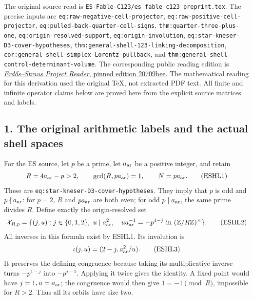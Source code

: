\documentclass[
  10pt,
  a4paper,
]{article}
\begin{document}
The original source read is
\texttt{ES-\allowbreak{}Fable-\allowbreak{}C123/\allowbreak{}es\_\allowbreak{}fable\_\allowbreak{}c123\_\allowbreak{}preprint.\allowbreak{}tex}. The precise inputs
are \texttt{eq:\allowbreak{}raw-\allowbreak{}negative-\allowbreak{}cell-\allowbreak{}projector},
\texttt{eq:\allowbreak{}raw-\allowbreak{}positive-\allowbreak{}cell-\allowbreak{}projector},
\texttt{eq:\allowbreak{}pulled-\allowbreak{}back-\allowbreak{}quarter-\allowbreak{}cell-\allowbreak{}signs},
\texttt{thm:\allowbreak{}quarter-\allowbreak{}three-\allowbreak{}plus-\allowbreak{}one},
\texttt{eq:\allowbreak{}origin-\allowbreak{}resolved-\allowbreak{}support}, \texttt{eq:\allowbreak{}origin-\allowbreak{}involution},
\texttt{eq:\allowbreak{}star-\allowbreak{}kneser-\allowbreak{}D3-\allowbreak{}cover-\allowbreak{}hypotheses},
\texttt{thm:\allowbreak{}general-\allowbreak{}shell-\allowbreak{}123-\allowbreak{}linking-\allowbreak{}decomposition},
\texttt{cor:\allowbreak{}general-\allowbreak{}shell-\allowbreak{}simplex-\allowbreak{}Lorentz-\allowbreak{}pullback}, and
\texttt{thm:\allowbreak{}general-\allowbreak{}shell-\allowbreak{}control-\allowbreak{}determinant-\allowbreak{}volume}. The corresponding
public reading edition is
\href{https://github.com/KokunoYumeto/erdos-straus-foundation/blob/20709bee872ad10e4cc7d7b976d975e24532a803/00_ERDOS_STRAUSS_Project_Reader.pdf}{\emph{Erdős--Straus
Project Reader}, pinned edition 20709bee}. The mathematical reading for
this derivation used the original TeX, not extracted PDF text. All
finite and infinite operator claims below are proved here from the
explicit source matrices and labels.

\subsection{1. The original arithmetic labels and the actual shell
spaces}\label{the-original-arithmetic-labels-and-the-actual-shell-spaces}

For the ES source, let \(p\) be a prime, let \(a_{\rm ar}\) be a
positive integer, and retain \[
R=4a_{\rm ar}-p>2,\qquad\gcd(R,pa_{\rm ar})=1,
\qquad N=pa_{\rm ar}.
\tag{ESHL1}
\] These are \texttt{eq:\allowbreak{}star-\allowbreak{}kneser-\allowbreak{}D3-\allowbreak{}cover-\allowbreak{}hypotheses}. They imply
that \(p\) is odd and \(p\nmid a_{\rm ar}\): for \(p=2\), \(R\) and
\(pa_{\rm ar}\) are both even; for odd \(p\mid a_{\rm ar}\), the same
prime divides \(R\). Define exactly the origin-resolved set \[
\mathcal X_{R,p}=
\{(j,u):j\in\{0,1,2\},\ u\mid a_{\rm ar}^2,
\quad u a_{\rm ar}^{-1}=-p^{1-j}\text{ in }(\mathbb Z/R\mathbb Z)^\times\}.
\tag{ESHL2}
\] All inverses in this formula exist by ESHL1. Its involution is \[
\iota(j,u)=(2-j,a_{\rm ar}^2/u).
\tag{ESHL3}
\] It preserves the defining congruence because taking its
multiplicative inverse turns \(-p^{1-j}\) into \(-p^{j-1}\). Applying it
twice gives the identity. A fixed point would have \(j=1,u=a_{\rm ar}\);
the congruence would then give \(1=-1\pmod R\), impossible for \(R>2\).
Thus all its orbits have size two.
\end{document}
